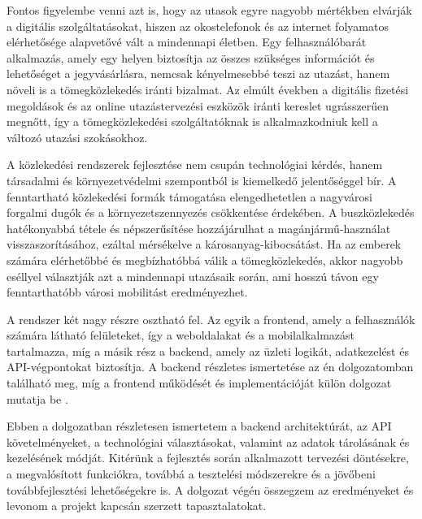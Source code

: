 Fontos figyelembe venni azt is, hogy az utasok egyre nagyobb mértékben elvárják a digitális szolgáltatásokat, hiszen az okostelefonok és az internet folyamatos elérhetősége alapvetővé vált a mindennapi életben. Egy felhasználóbarát alkalmazás, amely egy helyen biztosítja az összes szükséges információt és lehetőséget a jegyvásárlásra, nemcsak kényelmesebbé teszi az utazást, hanem növeli is a tömegközlekedés iránti bizalmat. Az elmúlt években a digitális fizetési megoldások és az online utazástervezési eszközök iránti kereslet ugrásszerűen megnőtt, így a tömegközlekedési szolgáltatóknak is alkalmazkodniuk kell a változó utazási szokásokhoz.

A közlekedési rendszerek fejlesztése nem csupán technológiai kérdés, hanem társadalmi és környezetvédelmi szempontból is kiemelkedő jelentőséggel bír. A fenntartható közlekedési formák támogatása elengedhetetlen a nagyvárosi forgalmi dugók és a környezetszennyezés csökkentése érdekében. A buszközlekedés hatékonyabbá tétele és népszerűsítése hozzájárulhat a magánjármű-használat visszaszorításához, ezáltal mérsékelve a károsanyag-kibocsátást. Ha az emberek számára elérhetőbbé és megbízhatóbbá válik a tömegközlekedés, akkor nagyobb eséllyel választják azt a mindennapi utazásaik során, ami hosszú távon egy fenntarthatóbb városi mobilitást eredményezhet.

A rendszer két nagy részre osztható fel. Az egyik a frontend, amely a felhasználók számára látható felületeket, így a weboldalakat és a mobilalkalmazást tartalmazza, míg a másik rész a backend, amely az üzleti logikát, adatkezelést és API-végpontokat biztosítja. A backend részletes ismertetése az én dolgozatomban található meg, míg a frontend működését és implementációját külön dolgozat mutatja be \cite{bus4uui}.

Ebben a dolgozatban részletesen ismertetem a backend architektúrát, az API követelményeket, a technológiai választásokat, valamint az adatok tárolásának és kezelésének módját. Kitérünk a fejlesztés során alkalmazott tervezési döntésekre, a megvalósított funkciókra, továbbá a tesztelési módszerekre és a jövőbeni továbbfejlesztési lehetőségekre is. A dolgozat végén összegzem az eredményeket és levonom a projekt kapcsán szerzett tapasztalatokat.

